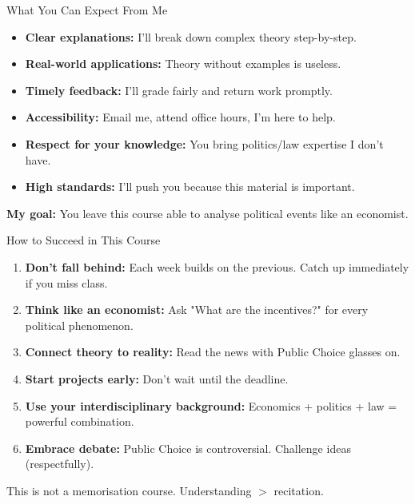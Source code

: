 \documentclass[10pt]{beamer}
\begin{document}
\begin{frame}{What You Can Expect From Me}
\begin{itemize}
\item \textbf{Clear explanations:} I'll break down complex theory step-by-step.
\item \textbf{Real-world applications:} Theory without examples is useless.
\item \textbf{Timely feedback:} I'll grade fairly and return work promptly.
\item \textbf{Accessibility:} Email me, attend office hours, I'm here to help.
\item \textbf{Respect for your knowledge:} You bring politics/law expertise I don't have.
\item \textbf{High standards:} I'll push you because this material is important.
\end{itemize}


\textbf{My goal:} You leave this course able to analyse political events like an economist.
\end{frame}

\begin{frame}{How to Succeed in This Course}
\begin{enumerate}
\item \textbf{Don't fall behind:} Each week builds on the previous. Catch up immediately if you miss class.
\item \textbf{Think like an economist:} Ask "What are the incentives?" for every political phenomenon.
\item \textbf{Connect theory to reality:} Read the news with Public Choice glasses on.
\item \textbf{Start projects early:} Don't wait until the deadline.
\item \textbf{Use your interdisciplinary background:} Economics + politics + law = powerful combination.
\item \textbf{Embrace debate:} Public Choice is controversial. Challenge ideas (respectfully).
\end{enumerate}


\small{This is not a memorisation course. Understanding $>$ recitation.}
\end{frame}
\end{document}

